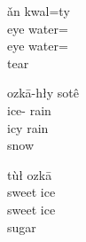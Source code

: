 \documentclass[12pt]{article}
\begin{document}
    \begin{exe}
        \ex
        \glll
        ǎn kwal=ty  \\
        eye water=\Poss{} \\
        eye water=\Poss{} \\
        \glt
        tear
    \end{exe}

    \begin{exe}
        \ex
        \glll
        ozkā-hły sotê \\
        ice-\Adj{} rain \\
        icy rain \\
        \glt
        snow
    \end{exe}

    \begin{exe}
        \ex
        \glll
        tùł ozkā \\
        sweet ice \\
        sweet ice \\
        \glt
        sugar
    \end{exe}
\end{document}
